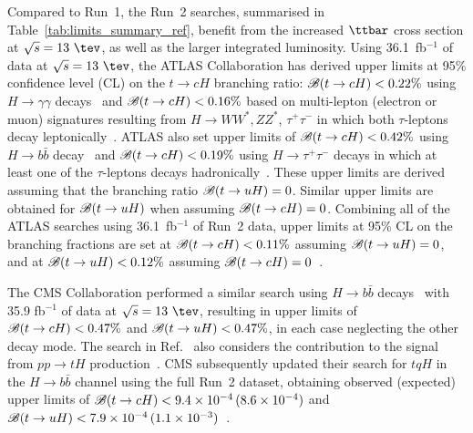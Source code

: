 Compared to Run~1, the Run~2 searches, summarised in Table~\ref{tab:limits_summary_ref}, benefit from the increased $\ttbar$ cross section at $\sqrt{s}=13~\tev$, as well as the larger integrated luminosity.
Using 36.1~fb$^{-1}$ of data at $\sqrt{s}=13~\tev$, the ATLAS Collaboration has derived upper limits at 95\% confidence level (CL) on the 
$t\to cH$ branching ratio: $\mathscr{B}(t\to cH)<0.22\%$ using $H\to \gamma\gamma$ decays~\cite{Aaboud:2017mfd} and $\mathscr{B}(t\to cH)<0.16\%$ based on
multi-lepton (electron or muon) signatures resulting from 
$H \to  WW^*, ZZ^*$, $\tau^+\tau^-$ in which both $\tau$-leptons decay leptonically~\cite{Aaboud:2018pob}.
ATLAS also set upper limits of $\mathscr{B}(t\to cH)<0.42\%$ using $H\to b\bar{b}$ decay~\cite{fcnc36} and $\mathscr{B}(t\to cH)<0.19\%$ using $H\to \tau^+\tau^-$ decays in which at least
one of the $\tau$-leptons decays hadronically~\cite{fcnc36}.  
These upper limits are derived assuming that the branching ratio $\mathscr{B}(t\to uH)=0$. Similar upper limits are obtained for $\mathscr{B}(t\to uH)$ when assuming $\mathscr{B}(t\to cH)=0$.
Combining all of the ATLAS searches using 36.1~fb$^{-1}$ of Run~2 data, upper limits at 95\% CL on the branching fractions are 
set at $\mathscr{B}(t\to cH)<0.11\%$ assuming $\mathscr{B}(t\to uH)=0$, and at $\mathscr{B}(t\to uH)<0.12\%$ assuming $\mathscr{B}(t\to cH)=0$~\cite{fcnc36}.

The CMS Collaboration performed a similar search using  
$H\to b\bar{b}$ decays~\cite{Sirunyan:2017uae} with 35.9 fb$^{-1}$ of data at $\sqrt{s}=13~\tev$, resulting 
in upper limits of $\mathscr{B}(t\to cH)<0.47\%$ and $\mathscr{B}(t\to uH)<0.47\%$, in each case neglecting the other decay mode.
The search in Ref.~\cite{Sirunyan:2017uae} also considers the contribution to the signal from 
$pp \to tH$ production~\cite{Greljo:2014dka}. 
CMS subsequently updated their search for $tqH$ in the $H\to b\bar{b}$ channel using
the full Run~2 dataset, obtaining observed (expected) upper limits of  $\mathscr{B}(t\to cH) < 9.4\times10^{-4}\, (8.6\times10^{-4})$
and $\mathscr{B}(t\to uH) < 7.9\times10^{-4}\, (1.1\times10^{-3})$~\cite{CMS:2021gfa}.


